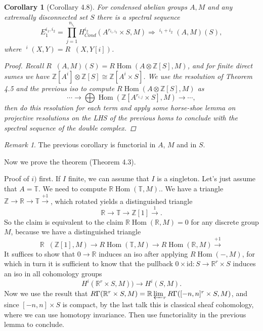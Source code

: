 \documentclass[12pt]{article}
\theoremstyle{darkgreentheorem}
\newtheorem{cor}[thm]{Corollary}
\theoremstyle{darkbluedefinition}
\theoremstyle{darkredexample}
\theoremstyle{remark}
\newtheorem{rem}[thm]{Remark}
\newcommand{\Z}{\mathbb{Z}}
\newcommand{\R}{\mathbb{R}}
\newcommand{\1}{\mathbbm{1}}
\newcommand{\bbT}{\mathbb{T}}
\DeclareMathOperator{\Hom}{Hom}
\DeclareMathOperator{\ihom}{\underline{Hom}}
\DeclareMathOperator{\iext}{\underline{Ext}}
\newcommand{\ot}{\otimes}
\newcommand{\id}{\mathrm{id}}
\newcommand{\tms}{\times}
\begin{document}
\begin{cor}[Corollary 4.8]
    For condensed abelian groups $A,M$ and any extremally disconnected set $S$ there is a spectral sequence
    \[ E_{1}^{i_{1},i_{2}}=\prod_{j=1}^{n_{i_{1}}}H^{i_{2}}_{Cond}(A^{r_{i_{1},i_{2}}}\tms S,M)\Rightarrow \iext^{i_{1}+i_{2}}(A,M)(S),\]
    where $\iext^{i}(X,Y)=R\ihom(X,Y[i])$.
    \begin{proof}
	Recall $R\ihom(A,M)(S)=R\Hom(A\ot\Z[S],M)$, and for finite direct sumes we have $\Z[A^{i}]\ot \Z[S]\cong \Z[A^{i}\tms S]$.
	We use the resolution of Theorem 4.5 and the previous iso to compute $R\Hom(A\ot \Z[S],M)$ as
	\[ \cdots \to \bigoplus \Hom(\Z[A^{r_{i,j}}\tms S],M)\to \cdots, \]
	then do this resolution for each term and apply some horse-shoe lemma on projective resolutions on the LHS of the previous homs to conclude with the spectral sequence of the double complex.
    \end{proof}
\end{cor}

\begin{rem}
    The previous corollary is functorial in $A$, $M$ and in $S$.
\end{rem}

Now we prove the theorem (Theorem 4.3).

Proof of $i)$ first.
If $I$ finite, we can assume that $I$ is a singleton.
Let's just assume that $A=\bbT$.
We need to compute $\R\Hom(\bbT,M)$..
We have a triangle $\Z\to \R\to \bbT\xrightarrow{+1}$, which rotated yields a distinguished triangle
\[ \R\to \bbT\to \Z[1]\xrightarrow{1}.\]
So the claim is equivalent to the claim $\R\Hom(\R,M)=0$ for any discrete group $M$, because we have a distinguished triangle
\[ \R\ihom(\Z[1],M)\to R\Hom(\bbT,M)\to R\Hom(\R,M) \xrightarrow{+1}\]
It suffices to show that $0\to \R$ induces an iso after applying $R\Hom(-,M)$, for which in turn it is sufficient to know that the pullback $0\times \id \colon S\to \R^{r}\times S$ induces an iso in all cohomology groups
\[ H^{i}(\R^{r}\times S,M))\to H^{i}(S,M). \]
Now we use the result that $R\Gamma(\R^{r}\tms S,M)=\R\varprojlim_{r}R\Gamma([-n,n]^{r}\tms S,M)$, and since $[-n,n]\tms S$ is compact, by the last talk this is classical sheaf cohomology, where we can use homotopy invariance.
Then use functoriality in the previous lemma to conclude.
\end{document}
